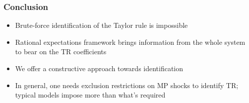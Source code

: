 \documentclass[handout]{beamer}
\begin{document}
\begin{frame}
\frametitle{Conclusion}

\begin{itemize} \itemsep=\bigskipamount
    \item Brute-force identification of the Taylor rule is impossible
    \item Rational expectations framework brings information from the whole system to bear on the TR coefficients
    \item We offer a constructive approach towards identification
    \item In general, one needs exclusion restrictions on  MP shocks to identify TR; typical models impose more than what's required
\end{itemize}

\end{frame}
\end{document}
